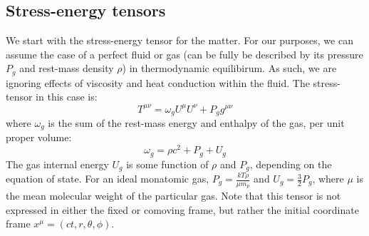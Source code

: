 \documentclass[../main.tex]{subfiles}
\begin{document}
\subsection{Stress-energy tensors}
We start with the stress-energy tensor for the matter.  For our purposes, we can assume the case of a perfect fluid or gas (can be fully be described by its pressure $P_g$ and rest-mass density $\rho$) in thermodynamic equilibirum.  As such, we are ignoring effects of viscosity and heat conduction within the fluid.  The stress-tensor in this case is:
\begin{equation}
    T^{\mu\nu}=\omega_gU^\mu U^\nu +P_gg^{\mu\nu}
\end{equation}
where $\omega_g$ is the sum of the rest-mass energy and enthalpy of the gas, per unit proper volume:
\begin{equation}
    \omega_g=\rho c^2+P_g+U_g
\end{equation}The gas internal energy $U_g$ is some function of $\rho$ and $P_g$, depending on the equation of state.  For an ideal monatomic gas, $P_g=\frac{kT\rho}{\mu m_p}$ and $U_g=\frac{3}{2}P_g$, where $\mu$ is the mean molecular weight of the particular gas.  Note that this tensor is not expressed in either the fixed or comoving frame, but rather the initial coordinate frame $x^\mu=(ct,r,\theta,\phi)$.\\
\end{document}
